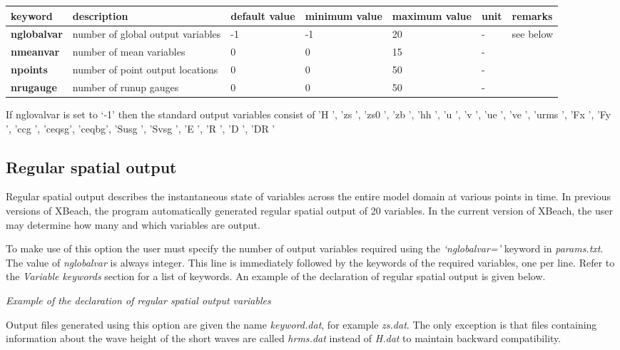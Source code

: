 \begin{tabular}{|p{0.6in}|p{1.0in}|p{0.4in}|p{0.5in}|p{0.5in}|p{0.3in}|p{0.5in}|} \hline 
keyword\textbf{} & description & default value & minimum value & maximum value & unit & remarks \\ \hline 
\textbf{nglobalvar} & number of global output variables & -1 & -1 & 20 & - & see below \\ \hline 
\textbf{nmeanvar} & number of mean variables & 0 & 0 & 15 & - &  \\ \hline 
\textbf{npoints} & number of point output locations & 0 & 0 & 50 & - &  \\ \hline 
\textbf{nrugauge} & number of runup gauges & 0 & 0 & 50 & - &  \\ \hline 
\end{tabular}

If nglovalvar is set to `-1' then the standard output variables consist of 'H    ', 'zs   ', 'zs0  ', 'zb   ', 'hh   ', 'u    ', 'v    ', 'ue   ', 've   ', 'urms ', 'Fx   ',   'Fy   ', 'ccg  ', 'ceqsg', 'ceqbg', 'Susg ', 'Svsg ', 'E    ', 'R    ', 'D    ', 'DR   ' 
\subsection{ Regular spatial output}

Regular spatial output describes the instantaneous state of variables across the entire model domain at various points in time. In previous versions of XBeach, the program automatically generated regular spatial output of 20 variables. In the current version of XBeach, the user may determine how many and which variables are output. 

To make use of this option the user must specify the number of output variables required using the \textit{`nglobalvar='} keyword in \textit{params.txt}. The value of \textit{nglobalvar} is always integer. This line is immediately followed by the keywords of the required variables, one per line. Refer to the \textit{Variable keywords} section for a list of keywords. An example of the declaration of regular spatial output is given below.

\textit{Example of the declaration of regular spatial output variables}

Output files generated using this option are given the name \textit{keyword.dat}, for example \textit{zs.dat}. The only exception is that files containing information about the wave height of the short waves are called \textit{hrms.dat} instead of \textit{H.dat} to maintain backward compatibility.
